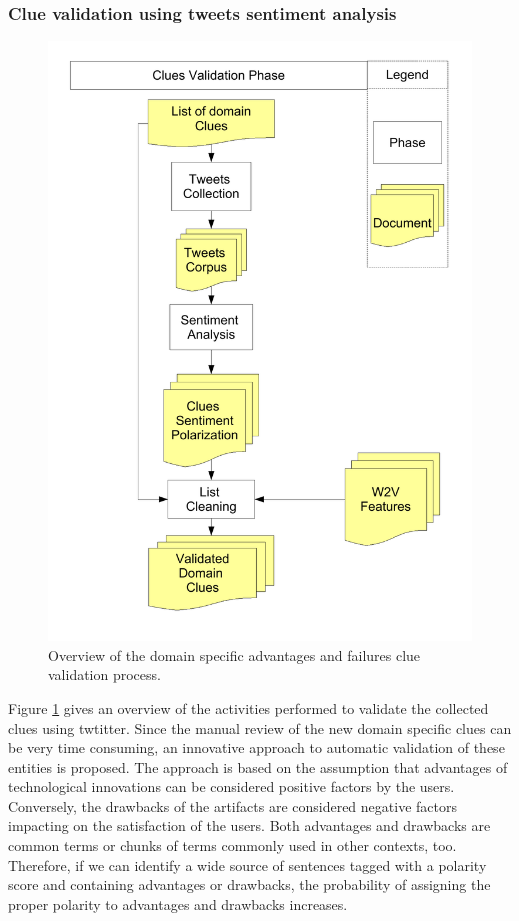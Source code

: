 \documentclass[]{book}
\begin{document}
\subsubsection*{Clue validation using tweets sentiment
analysis}\label{clue-validation-using-tweets-sentiment-analysis}

\begin{figure}

{\centering \includegraphics[width=0.8\linewidth]{_bookdown_files/figures/pointer-validation-phase} 

}

\caption{Overview of the domain specific advantages and failures clue validation process.}\label{fig:advdrwarticleprocessfigcluevalidationphase}
\end{figure}

Figure \ref{fig:advdrwarticleprocessfigcluevalidationphase} gives an
overview of the activities performed to validate the collected clues
using twtitter. Since the manual review of the new domain specific clues
can be very time consuming, an innovative approach to automatic
validation of these entities is proposed. The approach is based on the
assumption that advantages of technological innovations can be
considered positive factors by the users. Conversely, the drawbacks of
the artifacts are considered negative factors impacting on the
satisfaction of the users. Both advantages and drawbacks are common
terms or chunks of terms commonly used in other contexts, too.
Therefore, if we can identify a wide source of sentences tagged with a
polarity score and containing advantages or drawbacks, the probability
of assigning the proper polarity to advantages and drawbacks increases.
\end{document}
